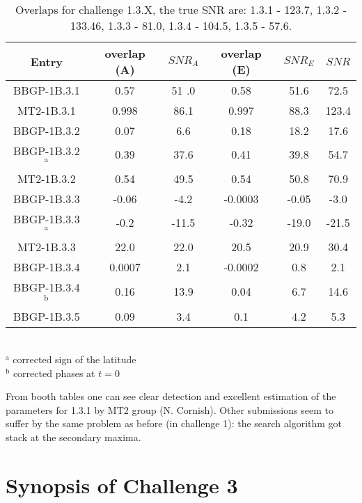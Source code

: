 \documentclass{iopart}
\begin{document}
\begin{table}
\caption{\label{EMRI2} Overlaps for challenge 1.3.X, the true SNR are: 1.3.1 - 123.7, 1.3.2 - 133.46, 1.3.3 - 81.0, 1.3.4 - 104.5, 1.3.5 - 57.6.} 
\begin{tabular}{|c|c|c|c|c|c|}
\hline
Entry & overlap (A) & $SNR_A$ &  overlap (E) & $SNR_E$ & $SNR$ \\
\hline
BBGP-1B.3.1 & 0.57 & 51 .0 & 0.58 & 51.6 & 72.5\\
MT2-1B.3.1  & 0.998 & 86.1 & 0.997 & 88.3 & 123.4\\
\hline
BBGP-1B.3.2 & 0.07 & 6.6 & 0.18 & 18.2 & 17.6\\
BBGP-1B.3.2$^\mathrm{a}$ & 0.39 & 37.6 & 0.41 & 39.8 & 54.7\\
MT2-1B.3.2  & 0.54 & 49.5 & 0.54 & 50.8 & 70.9 \\
\hline
BBGP-1B.3.3 & -0.06 & -4.2 & -0.0003 & -0.05 & -3.0 \\
BBGP-1B.3.3$^\mathrm{a}$ & -0.2 & -11.5 & -0.32 & -19.0 & -21.5\\
MT2-1B.3.3  & 22.0 &  22.0 & 20.5 & 20.9 & 30.4 \\
\hline
BBGP-1B.3.4 & 0.0007 & 2.1 & -0.0002 & 0.8 & 2.1\\
BBGP-1B.3.4$^\mathrm{b}$ & 0.16 & 13.9 & 0.04 & 6.7 & 14.6 \\ 
\hline
BBGP-1B.3.5 & 0.09 & 3.4 & 0.1 & 4.2 & 5.3\\
\hline
\end{tabular}\\
$^\mathrm{a}$ corrected sign of the latitude\\
$^\mathrm{b}$ corrected phases at $t=0$
\end{table}


From booth tables one can see clear detection and excellent estimation of the parameters for
1.3.1 by MT2 group (N. Cornish). Other submissions seem to suffer by the same problem as before (in challenge 1): the search algorithm got stack at the secondary maxima. 
 



\section{Synopsis of Challenge 3}
\end{document}
